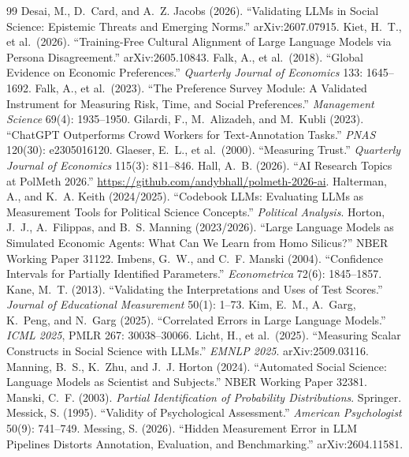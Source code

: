 \documentclass[10pt,letterpaper]{article}
\begin{document}
\begin{thebibliography}{99}
 Desai, M., D.~Card, and A.~Z. Jacobs (2026). ``Validating LLMs in Social Science: Epistemic Threats and Emerging Norms.'' arXiv:2607.07915.
 Kiet, H.~T., et al.\ (2026). ``Training-Free Cultural Alignment of Large Language Models via Persona Disagreement.'' arXiv:2605.10843.
 Falk, A., et al.\ (2018). ``Global Evidence on Economic Preferences.'' \textit{Quarterly Journal of Economics} 133: 1645--1692.
 Falk, A., et al.\ (2023). ``The Preference Survey Module: A Validated Instrument for Measuring Risk, Time, and Social Preferences.'' \textit{Management Science} 69(4): 1935--1950.
 Gilardi, F., M.~Alizadeh, and M.~Kubli (2023). ``ChatGPT Outperforms Crowd Workers for Text-Annotation Tasks.'' \textit{PNAS} 120(30): e2305016120.
 Glaeser, E.~L., et al.\ (2000). ``Measuring Trust.'' \textit{Quarterly Journal of Economics} 115(3): 811--846.
 Hall, A.~B. (2026). ``AI Research Topics at PolMeth 2026.'' \url{https://github.com/andybhall/polmeth-2026-ai}.
 Halterman, A., and K.~A. Keith (2024/2025). ``Codebook LLMs: Evaluating LLMs as Measurement Tools for Political Science Concepts.'' \textit{Political Analysis}.
 Horton, J.~J., A.~Filippas, and B.~S. Manning (2023/2026). ``Large Language Models as Simulated Economic Agents: What Can We Learn from Homo Silicus?'' NBER Working Paper 31122.
 Imbens, G.~W., and C.~F. Manski (2004). ``Confidence Intervals for Partially Identified Parameters.'' \textit{Econometrica} 72(6): 1845--1857.
 Kane, M.~T. (2013). ``Validating the Interpretations and Uses of Test Scores.'' \textit{Journal of Educational Measurement} 50(1): 1--73.
 Kim, E.~M., A.~Garg, K.~Peng, and N.~Garg (2025). ``Correlated Errors in Large Language Models.'' \textit{ICML 2025}, PMLR 267: 30038--30066.
 Licht, H., et al.\ (2025). ``Measuring Scalar Constructs in Social Science with LLMs.'' \textit{EMNLP 2025}. arXiv:2509.03116.
 Manning, B.~S., K.~Zhu, and J.~J. Horton (2024). ``Automated Social Science: Language Models as Scientist and Subjects.'' NBER Working Paper 32381.
 Manski, C.~F. (2003). \textit{Partial Identification of Probability Distributions}. Springer.
 Messick, S. (1995). ``Validity of Psychological Assessment.'' \textit{American Psychologist} 50(9): 741--749.
 Messing, S. (2026). ``Hidden Measurement Error in LLM Pipelines Distorts Annotation, Evaluation, and Benchmarking.'' arXiv:2604.11581.

\end{thebibliography}
\end{document}
